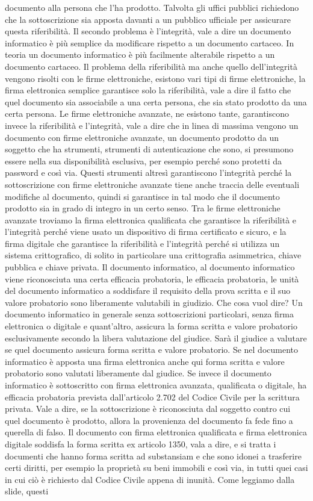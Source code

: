 documento alla persona che l'ha prodotto. Talvolta gli uffici pubblici richiedono che la sottoscrizione sia apposta davanti a un pubblico ufficiale per assicurare questa riferibilità. Il secondo problema è l'integrità, vale a dire un documento informatico è più semplice da modificare rispetto a un documento cartaceo. In teoria un documento informatico è più facilmente alterabile rispetto a un documento cartaceo. Il problema della riferibilità ma anche quello dell'integrità vengono risolti con le firme elettroniche, esistono vari tipi di firme elettroniche, la firma elettronica semplice garantisce solo la riferibilità, vale a dire il fatto che quel documento sia associabile a una certa persona, che sia stato prodotto da una certa persona. Le firme elettroniche avanzate, ne esistono tante, garantiscono invece la riferibilità e l'integrità, vale a dire che in linea di massima vengono un documento con firme elettroniche avanzate, un documento prodotto da un soggetto che ha strumenti, strumenti di autenticazione che sono, si presumono essere nella sua disponibilità esclusiva, per esempio perché sono protetti da password e così via. Questi strumenti altresì garantiscono l'integrità perché la sottoscrizione con firme elettroniche avanzate tiene anche traccia delle eventuali modifiche al documento, quindi si garantisce in tal modo che il documento prodotto sia in grado di integro in un certo senso. Tra le firme elettroniche avanzate troviamo la firma elettronica qualificata che garantisce la riferibilità e l'integrità perché viene usato un dispositivo di firma certificato e sicuro, e la firma digitale che garantisce la riferibilità e l'integrità perché si utilizza un sistema crittografico, di solito in particolare una crittografia asimmetrica, chiave pubblica e chiave privata. Il documento informatico, al documento informatico viene riconosciuta una certa efficacia probatoria, le efficacia probatoria, le unità del documento informatico a soddisfare il requisito della prova scritta e il suo valore probatorio sono liberamente valutabili in giudizio. Che cosa vuol dire? Un documento informatico in generale senza sottoscrizioni particolari, senza firma elettronica o digitale e quant'altro, assicura la forma scritta e valore probatorio esclusivamente secondo la libera valutazione del giudice. Sarà il giudice a valutare se quel documento assicura forma scritta e valore probatorio. Se nel documento informatico è apposta una firma elettronica anche qui forma scritta e valore probatorio sono valutati liberamente dal giudice. Se invece il documento informatico è sottoscritto con firma elettronica avanzata, qualificata o digitale, ha efficacia probatoria prevista dall'articolo 2.702 del Codice Civile per la scrittura privata. Vale a dire, se la sottoscrizione è riconosciuta dal soggetto contro cui quel documento è prodotto, allora la provenienza del documento fa fede fino a querella di falso. Il documento con firma elettronica qualificata e firma elettronica digitale soddisfa la forma scritta ex articolo 1350, vala a dire, e si tratta i documenti che hanno forma scritta ad substansiam e che sono idonei a trasferire certi diritti, per esempio la proprietà su beni immobili e così via, in tutti quei casi in cui ciò è richiesto dal Codice Civile appena di inunità. Come leggiamo dalla slide, questi 